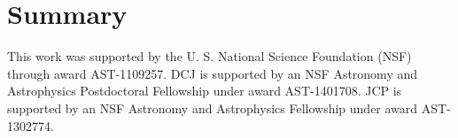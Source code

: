 \documentclass[preprint2,iop,numberedappendix,twocolappendix,appendixfloats]{emulateapj}
\begin{document}
\section{Summary}\label{sec:summary}

\acknowledgments

This work was supported by the U. S. National Science Foundation (NSF) through award AST-1109257. DCJ is supported by an NSF Astronomy and Astrophysics Postdoctoral Fellowship under award AST-1401708. JCP is supported by an NSF Astronomy and Astrophysics Fellowship under award AST-1302774. 




\end{document}
